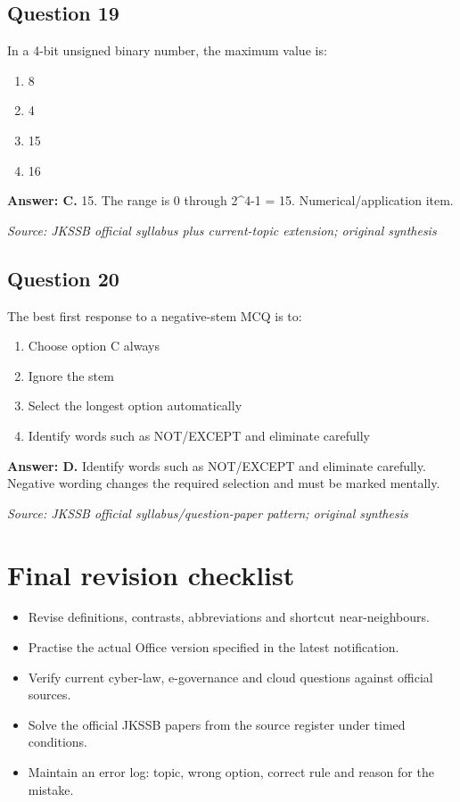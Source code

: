 \documentclass[11pt,a4paper]{book}
\newcommand{\source}[1]{\par\smallskip\textit{Source: #1}}
\newcommand{\answer}[2]{\par\textbf{Answer: #1.} #2}
\begin{document}
\section*{Question 19}
In a 4-bit unsigned binary number, the maximum value is:
\begin{enumerate}[label=\Alph*.]
\item 8
\item 4
\item 15
\item 16
\end{enumerate}
\answer{C}{15. The range is 0 through 2\^{}4-1 = 15. Numerical/application item.}
\source{JKSSB official syllabus plus current-topic extension; original synthesis}
\section*{Question 20}
The best first response to a negative-stem MCQ is to:
\begin{enumerate}[label=\Alph*.]
\item Choose option C always
\item Ignore the stem
\item Select the longest option automatically
\item Identify words such as NOT/EXCEPT and eliminate carefully
\end{enumerate}
\answer{D}{Identify words such as NOT/EXCEPT and eliminate carefully. Negative wording changes the required selection and must be marked mentally.}
\source{JKSSB official syllabus/question-paper pattern; original synthesis}

\backmatter
\chapter*{Final revision checklist}
\begin{itemize}
\item Revise definitions, contrasts, abbreviations and shortcut near-neighbours.
\item Practise the actual Office version specified in the latest notification.
\item Verify current cyber-law, e-governance and cloud questions against official sources.
\item Solve the official JKSSB papers from the source register under timed conditions.
\item Maintain an error log: topic, wrong option, correct rule and reason for the mistake.
\end{itemize}
\end{document}
